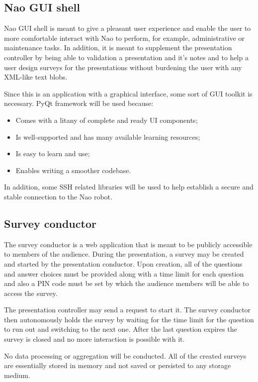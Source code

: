 \documentclass[12pt, fleqn, a4paper]{article}
\begin{document}
\subsection{Nao GUI shell}
Nao GUI shell is meant to give a pleasant user experience and enable the user to more comfortable interact with Nao to perform, for example, administrative or maintenance tasks. In addition, it is meant to supplement the presentation controller by being able to validation a presentation and it's notes and to help a user design surveys for the presentations without burdening the user with any XML-like text blobs.\par
Since this is an application with a graphical interface, some sort of GUI toolkit is necessary. PyQt framework will be used because:
\begin{itemize}
	\item Comes with a litany of complete and ready UI components;
	\item Is well-supported and has many available learning resources;
	\item Is easy to learn and use;
	\item Enables writing a smoother codebase.
\end{itemize}
In addition, some SSH related libraries will be used to help establish a secure and stable connection to the Nao robot.
\subsection{Survey conductor}
The survey conductor is a web application that is meant to be publicly accessible to members of the audience. During the presentation, a survey may be created and started by the presentation conductor. Upon creation, all of the questions and answer choices must be provided along with a time limit for each question and also a PIN code must be set by which the audience members will be able to access the survey.\par
The presentation controller may send a request to start it. The survey conductor then autonomously holds the survey by waiting for the time limit for the question to run out and switching to the next one. After the last question expires the survey is closed and no more interaction is possible with it.\par
No data processing or aggregation will be conducted. All of the created surveys are essentially stored in memory and not saved or persisted to any storage medium.
\end{document}
